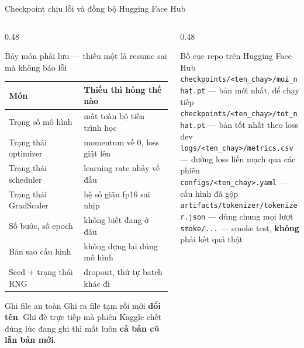 \documentclass[aspectratio=169, 10pt]{beamer}
\DeclareRobustCommand{\tk}[1]{\texttt{\textless #1\textgreater}}
\newcommand{\bangchat}{\setlength{\tabcolsep}{3pt}}
\begin{document}
\begin{frame}[shrink=15]{Checkpoint chịu lỗi và đồng bộ Hugging Face Hub}
  \begin{columns}[T]
    \begin{column}{0.48\textwidth}
      \begin{block}{Bảy món phải lưu — thiếu một là resume sai mà không báo lỗi}
        \scriptsize\bangchat
        \begin{tabular}{@{}p{2.6cm}p{3.6cm}@{}}
          \toprule
          \textbf{Món} & \textbf{Thiếu thì hỏng thế nào} \\
          \midrule
          Trọng số mô hình      & mất toàn bộ tiến trình học \\
          Trạng thái optimizer  & momentum về 0, loss giật lên \\
          Trạng thái scheduler  & learning rate nhảy về đầu \\
          Trạng thái GradScaler & hệ số giãn fp16 sai nhịp \\
          Số bước, số epoch     & không biết đang ở đâu \\
          Bản sao cấu hình      & không dựng lại đúng mô hình \\
          Seed + trạng thái RNG & dropout, thứ tự batch khác đi \\
          \bottomrule
        \end{tabular}
      \end{block}
      \begin{block}{Ghi file an toàn}
        \footnotesize
        Ghi ra file tạm rồi mới \textbf{đổi tên}. Ghi đè trực tiếp mà phiên Kaggle chết
        đúng lúc đang ghi thì mất luôn \textbf{cả bản cũ lẫn bản mới}.
      \end{block}
    \end{column}
    \begin{column}{0.48\textwidth}
      \begin{block}{Bố cục repo trên Hugging Face Hub}
        \scriptsize
        \texttt{checkpoints/}\tk{ten\_chay}\texttt{/moi\_nhat.pt} — bản mới nhất, để
        chạy tiếp \\
        \texttt{checkpoints/}\tk{ten\_chay}\texttt{/tot\_nhat.pt} — bản tốt nhất theo
        loss dev \\
        \texttt{logs/}\tk{ten\_chay}\texttt{/metrics.csv} — đường loss liền mạch qua
        các phiên \\
        \texttt{configs/}\tk{ten\_chay}\texttt{.yaml} — cấu hình đã gộp \\
        \texttt{artifacts/tokenizer/tokenizer.json} — dùng chung mọi lượt \\
        \texttt{smoke/...} — smoke test, \textbf{không} phải kết quả thật
      \end{block}
    \end{column}
  \end{columns}
\end{frame}
\end{document}
